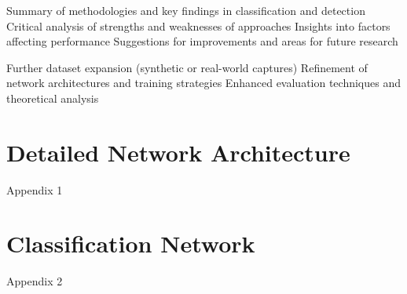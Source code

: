 \documentclass[conference]{IEEEtran}
\begin{document}
Summary of methodologies and key findings in classification and detection
Critical analysis of strengths and weaknesses of approaches
Insights into factors affecting performance
Suggestions for improvements and areas for future research

Further dataset expansion (synthetic or real-world captures)
Refinement of network architectures and training strategies
Enhanced evaluation techniques and theoretical analysis

\printbibsection

\appendices

\renewcommand{\thesection}{\Alph{section}}

\section{Detailed Network Architecture}

Appendix 1

\section{Classification Network}

Appendix 2
\end{document}
